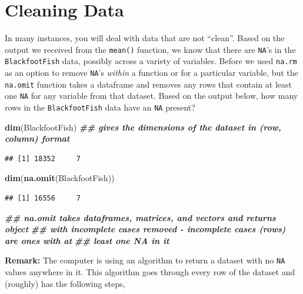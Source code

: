 \documentclass[
  10pt,
  letterpaper,
  twoside,
  openright]{book}
\newenvironment{Shaded}{\begin{snugshade}}{\end{snugshade}}
\newcommand{\DocumentationTok}[1]{\textcolor[rgb]{0.56,0.35,0.01}{\textbf{\textit{#1}}}}
\newcommand{\FunctionTok}[1]{\textcolor[rgb]{0.13,0.29,0.53}{\textbf{#1}}}
\newcommand{\NormalTok}[1]{#1}
\begin{document}
\hypertarget{cleaning-data}{%
\section{Cleaning Data}\label{cleaning-data}}

In many instances, you will deal with data that are not ``clean''. Based
on the output we received from the \texttt{mean()} function, we know
that there are \texttt{NA}'s in the \texttt{BlackfootFish} data,
possibly across a variety of variables. Before we used \texttt{na.rm} as
an option to remove \texttt{NA}'s \emph{within} a function or for a
particular variable, but the \texttt{na.omit} function takes a dataframe
and removes any rows that contain at least one \texttt{NA} for any
variable from that dataset. Based on the output below, how many rows in
the \texttt{BlackfootFish} data have an \texttt{NA} present?

\begin{Shaded}
\begin{Highlighting}[]
\FunctionTok{dim}\NormalTok{(BlackfootFish) }\DocumentationTok{\#\# gives the dimensions of the dataset in (row, column) format  }
\end{Highlighting}
\end{Shaded}

\begin{verbatim}
## [1] 18352     7
\end{verbatim}

\begin{Shaded}
\begin{Highlighting}[]
\FunctionTok{dim}\NormalTok{(}\FunctionTok{na.omit}\NormalTok{(BlackfootFish)) }
\end{Highlighting}
\end{Shaded}

\begin{verbatim}
## [1] 16556     7
\end{verbatim}

\begin{Shaded}
\begin{Highlighting}[]
\DocumentationTok{\#\# na.omit takes dataframes, matrices, and vectors and returns object }
\DocumentationTok{\#\# with incomplete cases removed {-} incomplete cases (rows) are ones with at }
\DocumentationTok{\#\# least one NA in it}
\end{Highlighting}
\end{Shaded}

\textbf{Remark:} The computer is using an algorithm to return a dataset
with no \texttt{NA} values anywhere in it. This algorithm goes through
every row of the dataset and (roughly) has the following steps,
\end{document}
